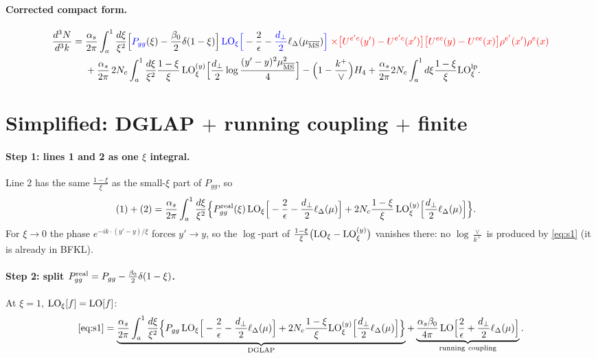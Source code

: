 \documentclass[10pt]{article}
\numberwithin{equation}{section}
\newcommand{\new}[1]{{\color{blue}#1}}
\newcommand{\old}[1]{{\color{red}#1}}
\newcommand{\LO}{{\rm LO}}
\newcommand{\MSb}{\overline{\rm MS}}
\begin{document}
\paragraph{Corrected compact form.}
\begin{align}
\frac{d^{3}N}{d^{3}k}={}&\frac{\alpha_s}{2\pi}\int_{a}^{1}\frac{d\xi}{\xi^{2}}\Big[\new{P_{gg}}(\xi)-\frac{\beta_{0}}{2}\delta(1-\xi)\Big]\,\new{\LO_\xi\Big[}-\frac{2}{\epsilon}-\new{\frac{d_\perp}{2}}\ell_\Delta(\mu_{\MSb})\new{\Big]}\;\old{\times\big[U^{e'c}(y')-U^{e'c}(x')\big]\big[U^{ec}(y)-U^{ce}(x)\big]\rho^{e'}(x')\rho^{e}(x)}\notag\\
&+\frac{\alpha_s}{2\pi}\,2N_c\int_a^1\frac{d\xi}{\xi^2}\frac{1-\xi}{\xi}\,\LO^{(y)}_\xi\Big[\frac{d_\perp}{2}\log\frac{(y'-y)^2\mu^2_{\MSb}}{4}\Big]
-\Big(1-\frac{k^+}{\vee}\Big)H_4+\frac{\alpha_s}{2\pi}2N_c\int_a^1d\xi\frac{1-\xi}{\xi}\LO^{\rm lp}_\xi.\label{eq:compact}
\end{align}

\section{Simplified: DGLAP $+$ running coupling $+$ finite}
\paragraph{Step 1: lines 1 and 2 as one $\xi$ integral.} Line 2 has the same $\frac{1-\xi}{\xi}$ as the small-$\xi$ part of $P_{gg}$, so
\begin{align}
\text{(1)}+\text{(2)}=\frac{\alpha_s}{2\pi}\int_a^1\frac{d\xi}{\xi^2}\Big\{&P^{\rm real}_{gg}(\xi)\,\LO_\xi\Big[-\frac2\epsilon-\frac{d_\perp}2\ell_\Delta(\mu)\Big]+2N_c\frac{1-\xi}{\xi}\,\LO^{(y)}_\xi\Big[\frac{d_\perp}{2}\ell_\Delta(\mu)\Big]\Big\}.\label{eq:s1}
\end{align}
For $\xi\to0$ the phase $e^{-ik\cdot(y'-y)/\xi}$ forces $y'\to y$, so the $\log$-part of $\frac{1-\xi}{\xi}\big(\LO_\xi-\LO^{(y)}_\xi\big)$ vanishes there: no $\log\frac{\vee}{k^+}$ is produced by \eqref{eq:s1} (it is already in BFKL).

\paragraph{Step 2: split $P^{\rm real}_{gg}=P_{gg}-\frac{\beta_0}2\delta(1-\xi)$.} At $\xi=1$, $\LO_\xi[f]=\LO[f]$:
\begin{align}
\eqref{eq:s1}=\underbrace{\frac{\alpha_s}{2\pi}\int_a^1\frac{d\xi}{\xi^2}\Big\{P_{gg}\,\LO_\xi\Big[-\frac2\epsilon-\frac{d_\perp}{2}\ell_\Delta(\mu)\Big]+2N_c\frac{1-\xi}{\xi}\LO^{(y)}_\xi\Big[\frac{d_\perp}{2}\ell_\Delta(\mu)\Big]\Big\}}_{\rm DGLAP}
+\underbrace{\frac{\alpha_s\beta_0}{4\pi}\,\LO\Big[\frac2\epsilon+\frac{d_\perp}{2}\ell_\Delta(\mu)\Big]}_{\rm running\ coupling}.\label{eq:s2}
\end{align}
\end{document}
